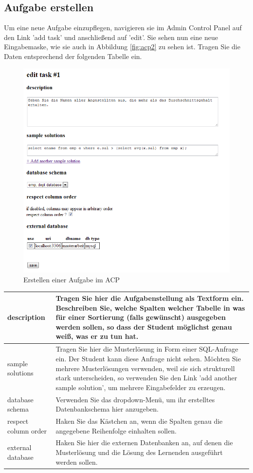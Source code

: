 \documentclass[12pt]{scrreprt}
\theoremstyle{remark}
\begin{document}
\subsection{Aufgabe erstellen}

Um eine neue Aufgabe einzupflegen, navigieren sie im Admin Control Panel auf den Link 'add task' und anschließend auf 'edit'. Sie sehen nun eine neue Eingabemaske, wie sie auch in Abbildung \ref{fig:acp2} zu sehen ist. Tragen Sie die Daten entsprechend der folgenden Tabelle ein.

\begin{figure}
\centering
\includegraphics[scale=0.61]{Bilder/screen_acp_1.png}
\caption{Erstellen einer Aufgabe im ACP}
\label{fig:acp}
\end{figure}

\begin{tabular}{|l|p{12cm}|}\hline
description & Tragen Sie hier die Aufgabenstellung als Textform ein. Beschreiben Sie, welche Spalten welcher Tabelle in was für einer Sortierung (falls gewünscht) ausgegeben werden sollen, so dass der Student möglichst genau weiß, was er zu tun hat.\\\hline
sample solutions & Tragen Sie hier die Musterlösung in Form einer SQL-Anfrage ein. Der Student kann diese Anfrage nicht sehen. Möchten Sie mehrere Musterlösungen verwenden, weil sie sich strukturell stark unterscheiden, so verwenden Sie den Link 'add another sample solution', um mehrere Eingabefelder zu erzeugen.\\\hline
database schema & Verwenden Sie das dropdown-Menü, um ihr erstelltes Datenbankschema hier anzugeben.\\\hline
respect column order & Haken Sie das Kästchen an, wenn die Spalten genau die angegebene Reihenfolge einhalten sollen.\\\hline
external database & Haken Sie hier die externen Datenbanken an, auf denen die Musterlösung und die Lösung des Lernenden ausgeführt werden sollen.\\\hline
\end{tabular}
\end{document}

